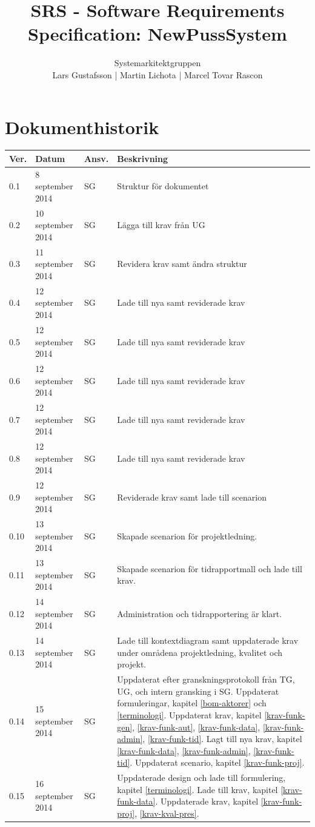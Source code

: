 \documentclass[a4paper]{article}
\title{SRS - Software Requirements Specification: NewPussSystem}
\author{Systemarkitektgruppen \\ Lars Gustafsson | Martin Lichota | Marcel Tovar Rascon}
\date{}
\begin{document}
\maketitle
\thispagestyle{fancy}
\tableofcontents
\newpage

\section*{Dokumenthistorik}

\begin{tabular}{ l l l p{8.5cm} }
Ver. & Datum & Ansv. & Beskrivning \\\hline
0.1 & 8 september 2014 & SG & Struktur för dokumentet\\
0.2 & 10 september 2014 & SG & Lägga till krav från UG\\
0.3 & 11 september 2014 & SG & Revidera krav samt ändra struktur\\
0.4 & 12 september 2014 & SG & Lade till nya samt reviderade krav\\
0.5 & 12 september 2014 & SG & Lade till nya samt reviderade krav\\
0.6 & 12 september 2014 & SG & Lade till nya samt reviderade krav\\
0.7 & 12 september 2014 & SG & Lade till nya samt reviderade krav\\
0.8 & 12 september 2014 & SG & Lade till nya samt reviderade krav\\
0.9 & 12 september 2014 & SG & Reviderade krav samt lade till scenarion\\
0.10 & 13 september 2014 & SG & Skapade scenarion för projektledning.\\
0.11 & 13 september 2014 & SG & Skapade scenarion för tidrapportmall och lade till krav.\\
0.12 & 14 september 2014 & SG & Administration och tidrapportering är klart.\\
0.13 & 14 september 2014 & SG & Lade till kontextdiagram samt uppdaterade krav under områdena projektledning, kvalitet och projekt.\\
0.14 & 15 september 2014 & SG & 
Uppdaterat efter granskningsprotokoll från TG, UG, och intern gransking i SG.
Uppdaterat formuleringar, kapitel \ref{bom-aktorer} och \ref{terminologi}. 
Uppdaterat krav, kapitel \ref{krav-funk-gen}, \ref{krav-funk-aut}, \ref{krav-funk-data}, \ref{krav-funk-admin}, \ref{krav-funk-tid}.
Lagt till nya krav, kapitel \ref{krav-funk-data}, \ref{krav-funk-admin}, \ref{krav-funk-tid}.
Uppdaterat scenario, kapitel \ref{krav-funk-proj}. \\
0.15 & 16 september 2014 & SG & Uppdaterade design och lade till formulering, kapitel \ref{terminologi}.
Lade till krav, kapitel \ref{krav-funk-data}.
Uppdaterade krav, kapitel \ref{krav-funk-proj}, \ref{krav-kval-pres}.

\\
\end{tabular}
\end{document}
